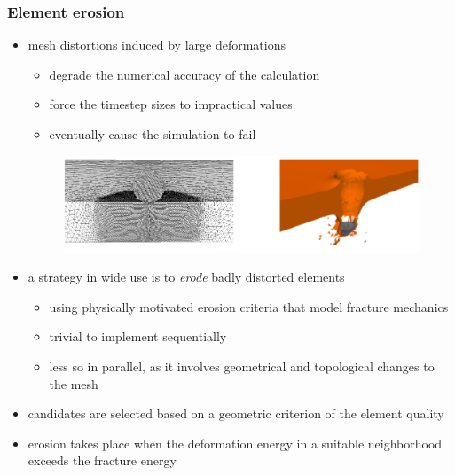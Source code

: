 \begin{frame}[fragile]
%
  \frametitle{Element erosion}
%
  \begin{itemize}
%
  \item mesh distortions induced by large deformations
    \begin{itemize}
    \item degrade the numerical accuracy of the calculation
    \item force the timestep sizes to impractical values
    \item eventually cause the simulation to fail
    \end{itemize}
    \begin{figure}
      \includegraphics[scale=0.5]{figures/mesh-penetration.pdf}
    \end{figure}
%
  \item a strategy in wide use is to {\em erode} badly distorted elements
    \begin{itemize}
    \item using physically motivated erosion criteria that model fracture mechanics
    \item trivial to implement sequentially
    \item less so in parallel, as it involves geometrical and topological changes to the mesh
    \end{itemize}
%
  \item candidates are selected based on a geometric criterion of the element quality
  \item erosion takes place when the deformation energy in a suitable neighborhood exceeds the
    fracture energy
%
  \end{itemize}
%
\end{frame}

